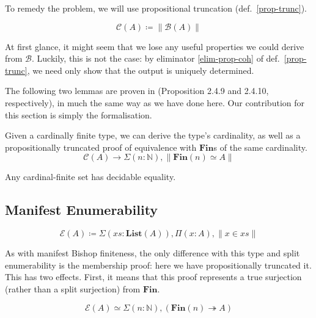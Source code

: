 To remedy the problem, we will use propositional truncation
(def.~\ref{prop-trunc}).
\begin{romdefinition}
  \begin{equation}
    \mathcal{C}(A) \coloneqq \lVert \mathcal{B}(A) \rVert
  \end{equation}
\end{romdefinition}
At first glance, it might seem that we lose any useful properties we could
derive from \(\mathcal{B}\).
Luckily, this is not the case: by eliminator \ref{elim-prop-coh} of
def.~\ref{prop-trunc}, we need only show that the output is uniquely determined.

The following two lemmas are proven in
\cite{yorgeyCombinatorialSpeciesLabelled2014} (Proposition 2.4.9 and 2.4.10,
respectively), in much the same way as we have done here.
Our contribution for this section is simply the formalisation.
\begin{romlemma}
  Given a cardinally finite type, we can derive the type's cardinality, as well
  as a propositionally truncated proof of equivalence with \(\textbf{Fin}\)s of
  the same cardinality.
  \begin{equation}
    \mathcal{C}(A) \rightarrow \Sigma {(n : \mathbb{N})} , \lVert \textbf{Fin}(n) \simeq A \rVert
  \end{equation}
\end{romlemma}
\begin{romlemma} \label{cardinal-finite-discrete}
  Any cardinal-finite set has decidable equality.
\end{romlemma}
\subsection{Manifest Enumerability}
\begin{romdefinition}
  \begin{equation}
    \mathcal{E}(A) \coloneqq \Sigma {(\mathit{xs} : \mathbf{List}(A))} , \Pi {(x : A)} , \lVert x \in \mathit{xs} \rVert
  \end{equation}
\end{romdefinition}
As with manifest Bishop finiteness, the only difference with this type and split
enumerability is the membership proof: here we have propositionally truncated
it.
This has two effects.
First, it means that this proof represents a true surjection (rather than a
split surjection) from \(\mathbf{Fin}\).
\begin{romlemma}
  \begin{equation}
    \mathcal{E}(A) \simeq \Sigma(n : \mathbb{N}) , (\mathbf{Fin}(n) \twoheadrightarrow A)
  \end{equation}
\end{romlemma}

